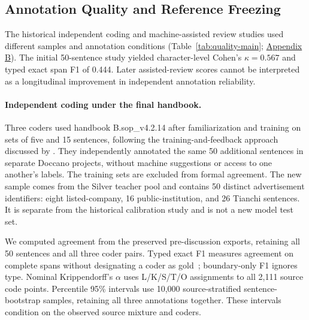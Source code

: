 \subsection{Annotation Quality and Reference Freezing}
\label{sec:annotation-quality}

The historical independent coding and machine-assisted review studies used different samples and annotation conditions (Table~\ref{tab:quality-main}; \hyperref[app:b]{Appendix B}). The initial 50-sentence study yielded character-level Cohen's $\kappa=0.567$ and typed exact span F1 of 0.444. Later assisted-review scores cannot be interpreted as a longitudinal improvement in independent annotation reliability.

\paragraph{Independent coding under the final handbook.}
Three coders used handbook B.sop\_v4.2.14 after familiarization and training on sets of five and 15 sentences, following the training-and-feedback approach discussed by \citet{klie2024annotationquality}. They independently annotated the same 50 additional sentences in separate Doccano projects, without machine suggestions or access to one another's labels. The training sets are excluded from formal agreement. The new sample comes from the Silver teacher pool and contains 50 distinct advertisement identifiers: eight listed-company, 16 public-institution, and 26 Tianchi sentences. It is separate from the historical calibration study and is not a new model test set.

We computed agreement from the preserved pre-discussion exports, retaining all 50 sentences and all three coder pairs. Typed exact F1 measures agreement on complete spans without designating a coder as gold~\citep{hripcsak2005agreement}; boundary-only F1 ignores type. Nominal Krippendorff's $\alpha$ uses L/K/S/T/O assignments to all 2,111 source code points. Percentile 95\% intervals use 10,000 source-stratified sentence-bootstrap samples, retaining all three annotations together. These intervals condition on the observed source mixture and coders.

